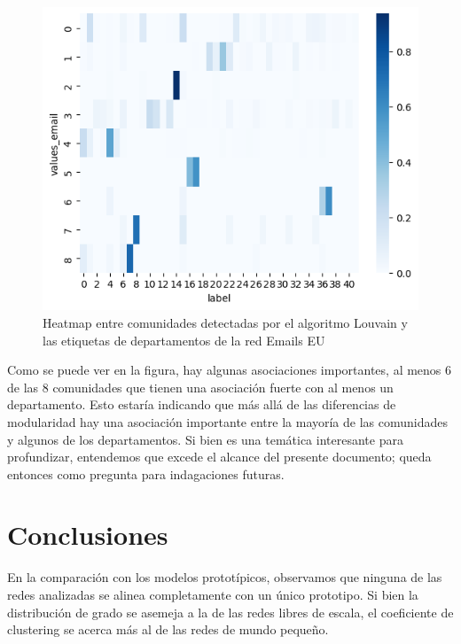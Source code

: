 \documentclass[conference]{IEEEtran}
\begin{document}
\begin{figure}[!h]
    \centering
    \includegraphics[width=\linewidth]{img/comu_contingencia_deptcom.png}
    \caption{Heatmap entre comunidades detectadas por el algoritmo Louvain y las etiquetas de departamentos de la red Emails EU}
    \label{fig:enter-label}
\end{figure}
\FloatBarrier
Como se puede ver en la figura, hay algunas asociaciones importantes, al menos 6 de las 8 comunidades que tienen una asociación fuerte con al menos un departamento. Esto estaría indicando que más allá de las diferencias de modularidad hay una asociación importante entre la mayoría de las comunidades y algunos de los departamentos. Si bien es una temática interesante para profundizar, entendemos que excede el alcance del presente documento; queda entonces como pregunta para indagaciones futuras.

\vspace{15pt}

\section{\textbf{Conclusiones}}

\vspace{10pt}
En la comparación con los modelos prototípicos, observamos que ninguna de las redes analizadas se alinea completamente con un único prototipo. Si bien la distribución de grado se asemeja a la de las redes libres de escala, el coeficiente de clustering se acerca más al de las redes de mundo pequeño.
\end{document}
